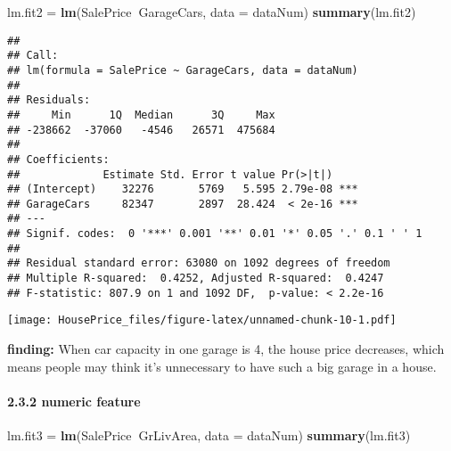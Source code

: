 \documentclass[]{article}
\newenvironment{Shaded}{\begin{snugshade}}{\end{snugshade}}
\newcommand{\KeywordTok}[1]{\textcolor[rgb]{0.13,0.29,0.53}{\textbf{#1}}}
\newcommand{\DataTypeTok}[1]{\textcolor[rgb]{0.13,0.29,0.53}{#1}}
\newcommand{\DecValTok}[1]{\textcolor[rgb]{0.00,0.00,0.81}{#1}}
\newcommand{\StringTok}[1]{\textcolor[rgb]{0.31,0.60,0.02}{#1}}
\newcommand{\OperatorTok}[1]{\textcolor[rgb]{0.81,0.36,0.00}{\textbf{#1}}}
\newcommand{\NormalTok}[1]{#1}
\let\oldparagraph\paragraph
\renewcommand{\paragraph}[1]{\oldparagraph{#1}\mbox{}}
\begin{document}
\begin{Shaded}
\begin{Highlighting}[]
\NormalTok{lm.fit2 =}\StringTok{ }\KeywordTok{lm}\NormalTok{(SalePrice}\OperatorTok{~}\NormalTok{GarageCars, }\DataTypeTok{data =}\NormalTok{ dataNum)}
\KeywordTok{summary}\NormalTok{(lm.fit2) }
\end{Highlighting}
\end{Shaded}

\begin{verbatim}
## 
## Call:
## lm(formula = SalePrice ~ GarageCars, data = dataNum)
## 
## Residuals:
##     Min      1Q  Median      3Q     Max 
## -238662  -37060   -4546   26571  475684 
## 
## Coefficients:
##             Estimate Std. Error t value Pr(>|t|)    
## (Intercept)    32276       5769   5.595 2.79e-08 ***
## GarageCars     82347       2897  28.424  < 2e-16 ***
## ---
## Signif. codes:  0 '***' 0.001 '**' 0.01 '*' 0.05 '.' 0.1 ' ' 1
## 
## Residual standard error: 63080 on 1092 degrees of freedom
## Multiple R-squared:  0.4252, Adjusted R-squared:  0.4247 
## F-statistic: 807.9 on 1 and 1092 DF,  p-value: < 2.2e-16
\end{verbatim}

\begin{Shaded}
\end{Shaded}

\texttt{[image: HousePrice\_files/figure-latex/unnamed-chunk-10-1.pdf]}

\textbf{finding:} When car capacity in one garage is 4, the house price
decreases, which means people may think it's unnecessary to have such a
big garage in a house.

\paragraph{2.3.2 numeric feature}\label{numeric-feature}

\begin{Shaded}
\begin{Highlighting}[]
\NormalTok{lm.fit3 =}\StringTok{ }\KeywordTok{lm}\NormalTok{(SalePrice}\OperatorTok{~}\NormalTok{GrLivArea, }\DataTypeTok{data =}\NormalTok{ dataNum)}
\KeywordTok{summary}\NormalTok{(lm.fit3) }
\end{Highlighting}
\end{Shaded}
\end{document}
